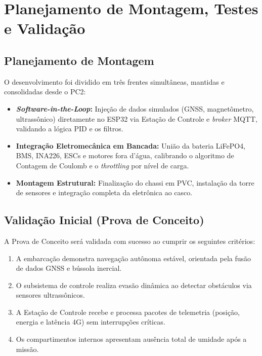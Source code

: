 \documentclass[12pt,a4paper]{article}
\begin{document}
\section{Planejamento de Montagem, Testes e Validação}

\subsection{Planejamento de Montagem}

O desenvolvimento foi dividido em três frentes simultâneas, mantidas e consolidadas desde o PC2:

\begin{itemize}
\item \textbf{\textit{Software-in-the-Loop}:} Injeção de dados simulados (GNSS, magnetômetro, ultrassônico) diretamente no ESP32 via Estação de Controle e \textit{broker} MQTT, validando a lógica PID e os filtros.
\item \textbf{Integração Eletromecânica em Bancada:} União da bateria LiFePO4, BMS, INA226, ESCs e motores fora d'água, calibrando o algoritmo de Contagem de Coulomb e o \textit{throttling} por nível de carga.
\item \textbf{Montagem Estrutural:} Finalização do chassi em PVC, instalação da torre de sensores e integração completa da eletrônica ao casco.
\end{itemize}

\subsection{Validação Inicial (Prova de Conceito)}

A Prova de Conceito será validada com sucesso ao cumprir os seguintes critérios:

\begin{enumerate}
\item A embarcação demonstra navegação autônoma estável, orientada pela fusão de dados GNSS e bússola inercial.
\item O subsistema de controle realiza evasão dinâmica ao detectar obstáculos via sensores ultrassônicos.
\item A Estação de Controle recebe e processa pacotes de telemetria (posição, energia e latência 4G) sem interrupções críticas.
\item Os compartimentos internos apresentam ausência total de umidade após a missão.
\end{enumerate}
\end{document}
